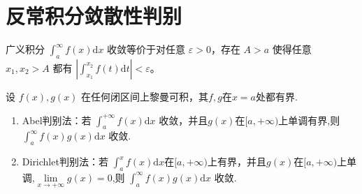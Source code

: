 \documentclass[../../main.tex]{subfiles}
\begin{document}
\section{反常积分敛散性判别}

\begin{theorem}[Cauchy收敛准则]
广义积分 \(\int_{a}^{\infty} f(x) \mathrm{d}x\) 收敛等价于对任意 \(\varepsilon > 0\)，存在 \(A > a\) 使得任意 \(x_1,x_2 > A\) 都有 \(\left|\int_{x_1}^{x_2} f(t) \mathrm{d}t\right| < \varepsilon\)。 
\end{theorem}

\begin{theorem}[A-D判别法]
设 \(f(x),g(x)\) 在任何闭区间上黎曼可积，其$f,g$在$x=a$处都有界.
\begin{enumerate}
\item {\heiti Abel判别法}：若 \(\int_{a}^{+\infty} f(x) \mathrm{d}x\) 收敛，并且$g(x)$在$[a,+\infty)$上单调有界,则 \(\int_{a}^{\infty} f(x)g(x) \mathrm{d}x\) 收敛.

\item {\heiti Dirichlet判别法}：若 \(\int_{a}^{x} f(x) \mathrm{d}x\)在$[a,+\infty)$上有界，并且\(g(x)\)在\([a,+\infty)\)上单调,$\underset{x\rightarrow +\infty}{\lim}g\left( x \right) =0$,则 \(\int_{a}^{\infty} f(x)g(x) \mathrm{d}x\) 收敛.
\end{enumerate}
\end{theorem}
\end{document}

